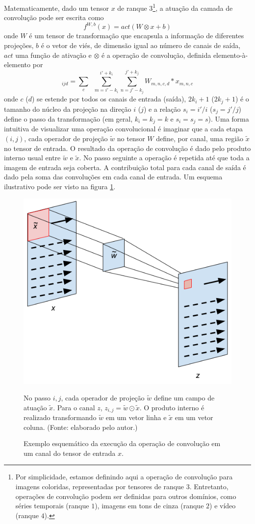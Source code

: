 Matematicamente, dado um tensor $x$ de ranque $3$\footnote{Por simplicidade, estamos definindo aqui a operação de convolução para imagens coloridas, representadas por tensores de ranque $3$. Entretanto, operações de convolução podem ser definidas para outros domínios, como séries temporais (ranque $1$), imagens em tons de cinza (ranque $2$) e vídeo (ranque $4$).}, a atuação da camada de convolução pode ser escrita como
\begin{equation}
f^{W,b}(x) = act(W \otimes x + b)
\end{equation}
onde $W$ é um tensor de transformação que encapsula a informação de diferentes projeções, $b$ é o vetor de viés, de dimensão igual ao número de canais de saída, $act$ uma função de ativação e $\otimes$ é a operação de convolução, definida elemento-à-elemento por
\begin{equation}
[W \otimes x]_{ijd} = \sum_{c} \;\; \sum_{m=i'-k_i}^{i'+ k_i} \sum_{n=j'-k_j}^{j'+k_j} W_{m, n, c, d} * x_{m, n, c}
\end{equation}
onde $c$ ($d$) se estende por todos os canais de entrada (saída), $2k_i+1$ ($2k_j+1$) é o tamanho do núcleo da projeção na direção $i$ ($j$) e a relação $s_i = i'/i$ ($s_j = j'/j$) define o passo da transformação (em geral, $k_i = k_j = k$ e $s_i = s_j = s$). Uma forma intuitiva de visualizar uma operação convolucional é imaginar que a cada etapa $(i,j)$, cada operador de projeção $\tilde{w}$ no tensor $W$ define, por canal, uma região $\tilde{x}$ no tensor de entrada. O resultado da operação de convolução é dado pelo produto interno usual entre $\tilde{w}$ e $\tilde{x}$. No passo seguinte a operação é repetida até que toda a imagem de entrada seja coberta. A contribuição total para cada canal de saída é dado pela soma das convoluções em cada canal de entrada. Um esquema ilustrativo pode ser visto na figura \ref{convw}. 

\begin{figure}[ht]
	\caption{Exemplo esquemático da execução da operação de convolução em um canal do tensor de entrada $x$.}
	\begin{center}
	\includegraphics[width=.6\linewidth]{figuras/convwa.png}
	\end{center}
	\small No passo $i,j$, cada operador de projeção $\tilde{w}$ define um campo de atuação $\tilde{x}$. Para o canal $z$, $z_{i,j} = \tilde{w} \odot \tilde{x}$. O produto interno é realizado transformando $\tilde{w}$ em um vetor linha e $\tilde{x}$ em um vetor coluna. (Fonte: elaborado pelo autor.)
	\label{convw}
\end{figure}

